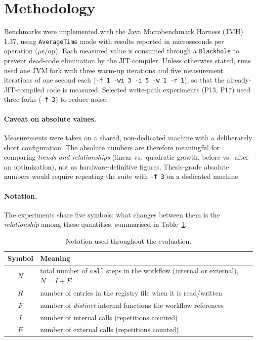 \section{Methodology}
\label{sec:eval-methodology}

Benchmarks were implemented with the Java Microbenchmark Harness (JMH) 1.37, using
\texttt{AverageTime} mode with results reported in microseconds per operation ($\mu$s/op). Each
measured value is consumed through a \texttt{Blackhole} to prevent dead-code elimination by the
JIT compiler. Unless otherwise stated, runs used one JVM fork with three warm-up iterations and
five measurement iterations of one second each (\texttt{-f 1 -wi 3 -i 5 -w 1 -r 1}), so that the
already-JIT-compiled code is measured. Selected write-path experiments (P13, P17) used three forks
(\texttt{-f 3}) to reduce noise.

\paragraph{Caveat on absolute values.}
Measurements were taken on a shared, non-dedicated machine with a deliberately short
configuration. The absolute numbers are therefore meaningful for comparing \emph{trends and
relationships} (linear vs.\ quadratic growth, before vs.\ after an optimization), not as
hardware-definitive figures. Thesis-grade absolute numbers would require repeating the suite with
\texttt{-f 3} on a dedicated machine.

\paragraph{Notation.}
The experiments share five symbols; what changes between them is the \emph{relationship} among
these quantities, summarised in Table~\ref{tab:eval-notation}.

\begin{table}[htbp]
  \centering
  \caption{Notation used throughout the evaluation.}
  \label{tab:eval-notation}
  \begin{tabular}{cl}
    \hline
    \textbf{Symbol} & \textbf{Meaning} \\
    \hline
    $N$ & total number of \texttt{call} steps in the workflow (internal or external), $N = I + E$ \\
    $R$ & number of entries in the registry file when it is read/written \\
    $F$ & number of \emph{distinct} internal functions the workflow references \\
    $I$ & number of internal calls (repetitions counted) \\
    $E$ & number of external calls (repetitions counted) \\
    \hline
  \end{tabular}
\end{table}

